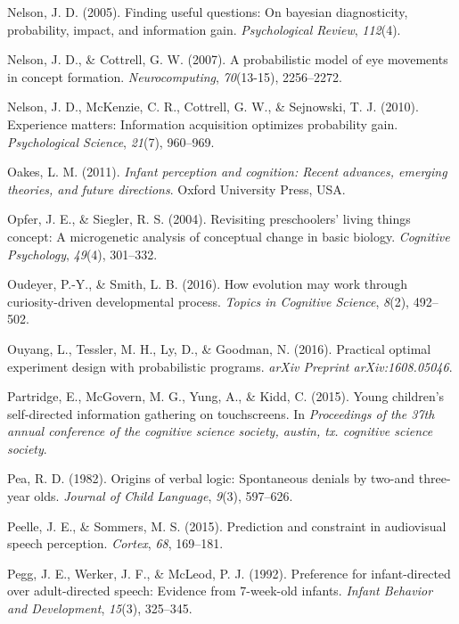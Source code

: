 \documentclass[oneside]{report}
\begin{document}
\hypertarget{ref-nelson2005finding}{}
Nelson, J. D. (2005). Finding useful questions: On bayesian
diagnosticity, probability, impact, and information gain.
\emph{Psychological Review}, \emph{112}(4).

\hypertarget{ref-nelson2007probabilistic}{}
Nelson, J. D., \& Cottrell, G. W. (2007). A probabilistic model of eye
movements in concept formation. \emph{Neurocomputing}, \emph{70}(13-15),
2256--2272.

\hypertarget{ref-nelson2010experience}{}
Nelson, J. D., McKenzie, C. R., Cottrell, G. W., \& Sejnowski, T. J.
(2010). Experience matters: Information acquisition optimizes
probability gain. \emph{Psychological Science}, \emph{21}(7), 960--969.

\hypertarget{ref-oakes2011infant}{}
Oakes, L. M. (2011). \emph{Infant perception and cognition: Recent
advances, emerging theories, and future directions}. Oxford University
Press, USA.

\hypertarget{ref-opfer2004revisiting}{}
Opfer, J. E., \& Siegler, R. S. (2004). Revisiting preschoolers' living
things concept: A microgenetic analysis of conceptual change in basic
biology. \emph{Cognitive Psychology}, \emph{49}(4), 301--332.

\hypertarget{ref-oudeyer2016evolution}{}
Oudeyer, P.-Y., \& Smith, L. B. (2016). How evolution may work through
curiosity-driven developmental process. \emph{Topics in Cognitive
Science}, \emph{8}(2), 492--502.

\hypertarget{ref-ouyang2016practical}{}
Ouyang, L., Tessler, M. H., Ly, D., \& Goodman, N. (2016). Practical
optimal experiment design with probabilistic programs. \emph{arXiv
Preprint arXiv:1608.05046}.

\hypertarget{ref-partridge2015young}{}
Partridge, E., McGovern, M. G., Yung, A., \& Kidd, C. (2015). Young
children's self-directed information gathering on touchscreens. In
\emph{Proceedings of the 37th annual conference of the cognitive science
society, austin, tx. cognitive science society}.

\hypertarget{ref-pea1982origins}{}
Pea, R. D. (1982). Origins of verbal logic: Spontaneous denials by
two-and three-year olds. \emph{Journal of Child Language}, \emph{9}(3),
597--626.

\hypertarget{ref-peelle2015prediction}{}
Peelle, J. E., \& Sommers, M. S. (2015). Prediction and constraint in
audiovisual speech perception. \emph{Cortex}, \emph{68}, 169--181.

\hypertarget{ref-pegg1992preference}{}
Pegg, J. E., Werker, J. F., \& McLeod, P. J. (1992). Preference for
infant-directed over adult-directed speech: Evidence from 7-week-old
infants. \emph{Infant Behavior and Development}, \emph{15}(3), 325--345.
\end{document}
